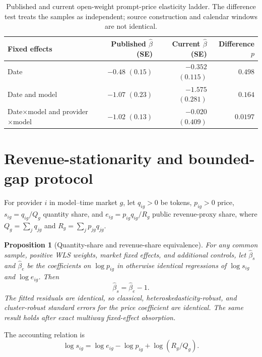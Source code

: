 \documentclass[11pt]{article}
\newcommand{\1}{\mathbf{1}}
\newtheorem{proposition}{Proposition}
\begin{document}
\begin{table}[H]
\centering
\small
\begin{tabular}{lrrr}
\toprule
Fixed effects & Published $\widehat\beta$ (SE) & Current $\widehat\beta$ (SE) & Difference $p$ \\
\midrule
Date & $-0.48$ $(0.15)$ & $-0.352$ $(0.115)$ & $0.498$ \\
Date and model & $-1.07$ $(0.23)$ & $-1.575$ $(0.281)$ & $0.164$ \\
Date$\times$model and provider$\times$model & $-1.02$ $(0.13)$ & $-0.020$ $(0.409)$ & $0.0197$ \\
\bottomrule
\end{tabular}
\caption{Published and current open-weight prompt-price elasticity ladder.  The
difference test treats the samples as independent; source construction and
calendar windows are not identical.}
\label{tab:revenue-replication}
\end{table}

\section{Revenue-stationarity and bounded-gap protocol}
\label{app:revenue-stationarity}

For provider $i$ in model--time market $g$, let $q_{ig}>0$ be tokens,
$p_{ig}>0$ price, $s_{ig}=q_{ig}/Q_g$ quantity share, and
$e_{ig}=p_{ig}q_{ig}/R_g$ public revenue-proxy share, where
$Q_g=\sum_jq_{jg}$ and $R_g=\sum_jp_{jg}q_{jg}$.

\begin{proposition}[Quantity-share and revenue-share equivalence]
\label{prop:revenue-share-identity}
For any common sample, positive WLS weights, market fixed effects, and additional
controls, let $\widehat\beta_s$ and $\widehat\beta_e$ be the coefficients on
$\log p_{ig}$ in otherwise identical regressions of $\log s_{ig}$ and
$\log e_{ig}$.  Then
\begin{equation}
  \widehat\beta_s=\widehat\beta_e-1.
  \label{eq:revenue-share-beta}
\end{equation}
The fitted residuals are identical, so classical, heteroskedasticity-robust, and
cluster-robust standard errors for the price coefficient are identical.  The
same result holds after exact multiway fixed-effect absorption.
\end{proposition}

The accounting relation is
\begin{equation}
 \log s_{ig}=\log e_{ig}-\log p_{ig}
 +\log(R_g/Q_g).
 \label{eq:revenue-share-accounting}
\end{equation}
\end{document}
